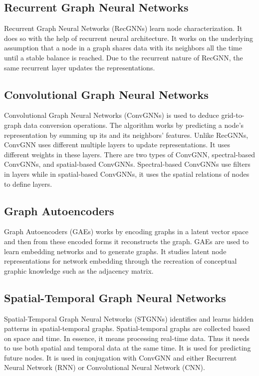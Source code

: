 \documentclass[journal,twoside,web]{ieeecolor}
\begin{document}
\subsection{Recurrent Graph Neural Networks}
Recurrent Graph Neural Networks (RecGNNs) learn node characterization. It does so with the help of recurrent neural architecture. It works on the underlying assumption that a node in a graph shares data with its neighbors all the time until a stable balance is reached. Due to the recurrent nature of RecGNN, the same recurrent layer updates the representations.

\subsection{Convolutional Graph Neural Networks}
Convolutional Graph Neural Networks (ConvGNNs) is used to deduce grid-to-graph data conversion operations. The algorithm works by predicting a node's representation by summing up its and its neighbors' features. Unlike RecGNNs, ConvGNN uses different multiple layers to update representations. It uses different weights in these layers. There are two types of ConvGNN, spectral-based ConvGNNs, and spatial-based ConvGNNs. Spectral-based ConvGNNs use filters in layers while in spatial-based ConvGNNs, it uses the spatial relations of nodes to define layers.

\subsection{Graph Autoencoders}
Graph Autoencoders (GAEs) works by encoding graphs in a latent vector space and then from these encoded forms it reconstructs the graph. GAEs are used to learn embedding networks and to generate graphs. It studies latent node representations for network embedding through the recreation of conceptual graphic knowledge such as the adjacency matrix.

\subsection{Spatial-Temporal Graph Neural Networks}
Spatial-Temporal Graph Neural Networks (STGNNs) identifies and learns hidden patterns in spatial-temporal graphs. Spatial-temporal graphs are collected based on space and time. In essence, it means processing real-time data. Thus it needs to use both spatial and temporal data at the same time. It is used for predicting future nodes. It is used in conjugation with ConvGNN and either Recurrent Neural Network (RNN) or Convolutional Neural Network (CNN).
\end{document}
